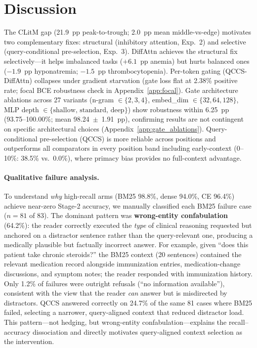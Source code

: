 \documentclass{article}
\begin{document}
\section{Discussion}
\label{sec:discussion}

The CLitM gap (21.9~pp peak-to-trough; 2.0~pp mean middle-vs-edge) motivates two
complementary fixes: structural (inhibitory attention, Exp.~2) and selective
(query-conditional pre-selection, Exp.~3). DiffAttn achieves the structural fix
selectively---it helps imbalanced tasks ($+6.1$~pp anemia) but hurts balanced ones
($-1.9$~pp hyponatremia; $-1.5$~pp thrombocytopenia). Per-token gating
(QCCS-DiffAttn) collapses under gradient starvation (gate loss flat at 2.38\%
positive rate; focal BCE robustness check in Appendix~\ref{app:focal}).
Gate architecture ablations across 27 variants (n-gram $\in\{2,3,4\}$,
embed\_dim $\in\{32,64,128\}$, MLP depth $\in\{\text{shallow, standard, deep}\}$)
show robustness within 6.25~pp (93.75--100.00\%; mean 98.24~$\pm$~1.91~pp),
confirming results are not contingent on specific architectural choices
(Appendix~\ref{app:gate_ablations}).
Query-conditional pre-selection (QCCS) is more reliable across positions and
outperforms all comparators in every position band including early-context
(0--10\%: 38.5\% vs.\ 0.0\%), where primacy bias provides no full-context advantage.

\paragraph{Qualitative failure analysis.}
To understand \emph{why} high-recall arms (BM25 98.8\%, dense 94.0\%, CE 96.4\%)
achieve near-zero Stage-2 accuracy, we manually classified each BM25 failure
case ($n{=}81$ of 83). The dominant pattern was \textbf{wrong-entity confabulation}
(64.2\%): the reader correctly executed the \emph{type} of clinical reasoning
requested but anchored on a distractor sentence rather than the query-relevant
one, producing a medically plausible but factually incorrect answer. For example,
given ``does this patient take chronic steroids?'' the BM25 context (20 sentences)
contained the relevant medication record alongside immunization entries, medication-change
discussions, and symptom notes; the reader responded with immunization history. Only
1.2\% of failures were outright refusals (``no information available''), consistent
with the view that the reader \emph{can} answer but is misdirected by distractors.
QCCS answered correctly on 24.7\% of the same 81 cases where BM25 failed,
selecting a narrower, query-aligned context that reduced distractor load.
This pattern---not hedging, but wrong-entity confabulation---explains the
recall–accuracy dissociation and directly motivates query-aligned context
selection as the intervention.
\end{document}
